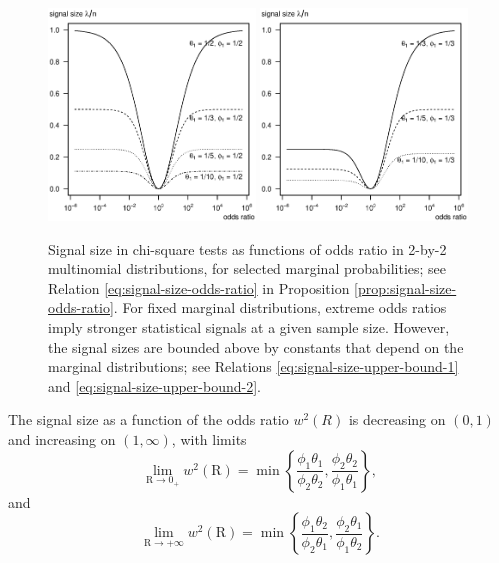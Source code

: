\begin{figure}
      \centering
      \includegraphics[width=0.49\textwidth]{./singal-vs-odds-p05}
      \includegraphics[width=0.49\textwidth]{./singal-vs-odds-p0333}            
      \caption{Signal size in chi-square tests as functions of odds ratio in 2-by-2 multinomial distributions, for selected marginal probabilities; see Relation \eqref{eq:signal-size-odds-ratio} in Proposition \ref{prop:signal-size-odds-ratio}.
      For fixed marginal distributions, extreme odds ratios imply stronger statistical signals at a given sample size.
      However, the signal sizes are bounded above by constants that depend on the marginal distributions; see Relations \eqref{eq:signal-size-upper-bound-1} and \eqref{eq:signal-size-upper-bound-2}.
      } 
      \label{fig:signal-vs-odds}
\end{figure}

\begin{corollary} \label{cor:signal-limits-OR}
The signal size as a function of the odds ratio $w^2(R)$ is decreasing on $(0,1)$ and increasing on $(1,\infty)$, with limits
\begin{equation} \label{eq:signal-size-upper-bound-1}
    \lim_{\text{R}\to0_+} w^2(\text{R}) = \min\left\{\frac{\phi_1\theta_1}{\phi_2\theta_2}, \frac{\phi_2\theta_2}{\phi_1\theta_1}\right\},
\end{equation}
and
\begin{equation} \label{eq:signal-size-upper-bound-2}
    \lim_{\text{R}\to+\infty} w^2(\text{R}) = \min\left\{\frac{\phi_1\theta_2}{\phi_2\theta_1}, \frac{\phi_2\theta_1}{\phi_1\theta_2}\right\}.
\end{equation}
\end{corollary}


